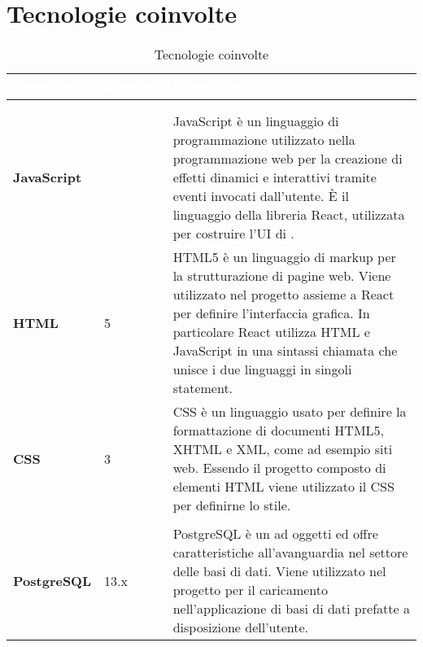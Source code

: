 \section{Tecnologie coinvolte}

{
\setlength\arrayrulewidth{0.95pt}
\renewcommand{\arraystretch}{1.5}
\begin{longtable}{C{3cm} C{2cm} C{10cm}}

\textcolor{white}{\textbf{Tecnologia}}&
\textcolor{white}{\textbf{Versione}}&
\textcolor{white}{\textbf{Descrizione}} \\
\endfirsthead
{}\\
\endfoot
{}\caption{Tecnologie coinvolte}
\endlastfoot
	
 \\

	\textbf{JavaScript} & 
	 &
	JavaScript è un linguaggio di programmazione utilizzato nella programmazione web per la creazione di effetti dinamici e interattivi tramite eventi invocati dall'utente. È il linguaggio della libreria React, utilizzata per costruire l'UI di \NomeProgetto{}.\\

	\textbf{HTML} &
	5 &
	HTML5 è un linguaggio di markup per la strutturazione di pagine web. Viene utilizzato nel progetto \NomeProgetto{} assieme a React per definire l'interfaccia grafica. In particolare React utilizza HTML e JavaScript in una sintassi chiamata  che unisce i due linguaggi in singoli statement.\\
	
	\textbf{CSS} &
	3 & 
	CSS è un linguaggio usato per definire la formattazione di documenti HTML5, XHTML e XML, come ad esempio siti web.
Essendo il progetto \NomeProgetto{} composto di elementi HTML viene utilizzato il CSS per definirne lo stile. \\
	
 \\

	\textbf{PostgreSQL} & 
	13.x &
	PostgreSQL è un  ad oggetti ed offre caratteristiche all'avanguardia nel settore delle basi di dati. Viene utilizzato nel progetto per il caricamento nell'applicazione di basi di dati prefatte a disposizione dell'utente. \\
 

\end{longtable}}
